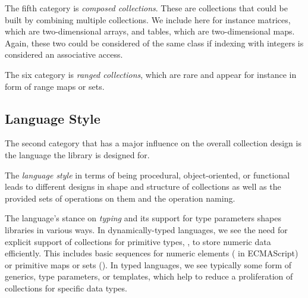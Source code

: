 \documentclass[sigconf, 10pt]{acmart}
\begin{document}
The fifth category is \emph{composed collections}.
These are collections that could be built by combining multiple collections.
We include here for instance matrices, which are two-dimensional arrays,
and tables, which are two-dimensional maps.
Again, these two could be considered of the same class
if indexing with integers is considered an associative access.

The six category is \emph{ranged collections},
which are rare and appear for instance in form of range maps or sets.

\subsection{Language Style}
\label{sec:language-style}

The second category that has a major influence on the overall collection design
is the language the library is designed for.

The \emph{language style} in terms of being procedural, object-oriented,
or functional leads to different designs in shape and structure of collections
as well as the provided sets of operations on them and the operation naming.

The language's stance on \emph{typing} and its support for type parameters
shapes libraries in various ways.
In dynamically-typed languages,
we see the need for explicit support of collections for primitive types, \eg,
to store numeric data efficiently.
This includes basic sequences for numeric elements (\eg {} in ECMAScript)
or primitive maps or sets (\eg {}).
In typed languages,
we see typically some form of generics, type parameters, or templates,
which help to reduce a proliferation of collections for specific data types.
\end{document}
